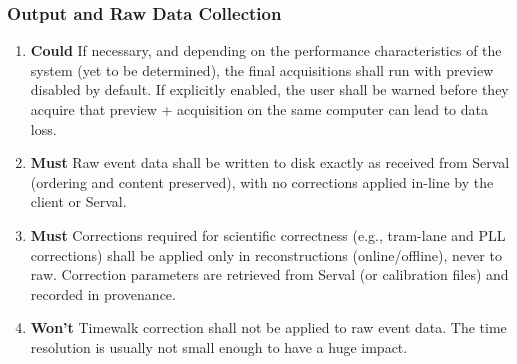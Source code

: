 \documentclass[10pt]{article}
\newcommand{\PriorityTag}[2]{%
    \colorbox{#2!25}{\footnotesize\textsf{\textbf{#1}}}\hspace{0.6em}}
\newcommand{\must}{\leavevmode\PriorityTag{Must}{green}}
\newcommand{\could}{\leavevmode\PriorityTag{Could}{cyan}}
\newcommand{\wont}{\leavevmode\PriorityTag{Won't}{red}}
\newcounter{reqgrp}[section] %
\newcounter{reqno}
\newcommand{\reqprefix}{GEN}
\newenvironment{requirements}[1]{%
    \renewcommand{\reqprefix}{#1}%
    \refstepcounter{reqgrp}%
    \setcounter{reqno}{0}%
    \begin{enumerate}[leftmargin=*]
    }{\end{enumerate}}
\begin{document}
    \subsubsection{Output and Raw Data Collection}
    \begin{requirements}{OUT}

        \item \could {}
        {If necessary, and depending on the performance characteristics of the system (yet to be determined), the final acquisitions shall run with preview disabled by default. If explicitly enabled, the user shall be warned before they acquire that preview + acquisition on the same computer can lead to data loss.}

        \item \must {}
        {Raw event data shall be written to disk exactly as received from Serval (ordering and content preserved), with no corrections applied in-line by the client or Serval.}

        \item \must {}
        {Corrections required for scientific correctness (e.g., tram-lane and PLL corrections) shall be applied only in reconstructions (online/offline), never to raw. Correction parameters are retrieved from Serval (or calibration files) and recorded in provenance.}

        \item \wont {}
        {Timewalk correction shall not be applied to raw event data. The time resolution is usually not small enough to have a huge impact.}


\end{requirements}
\end{document}
